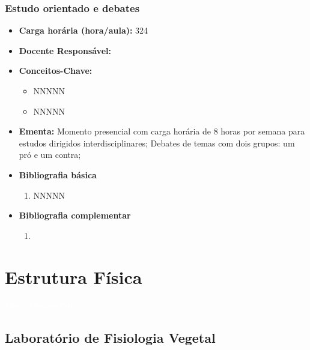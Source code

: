 \documentclass[11pt,fleqn]{book} %
\begin{document}
\newpage
\subsection{Estudo orientado e debates}\label{disc:estudo}
\begin{itemize}
	\item \textbf{Carga horária (hora/aula):} 324
	\item \textbf{Docente Responsável:}
	\item \textbf{Conceitos-Chave:}
	\begin{itemize}
		\item NNNNN
		\item NNNNN
	\end{itemize}
	\item \textbf{Ementa:} Momento presencial com carga horária de 8 horas por semana para estudos dirigidos interdisciplinares; Debates de temas com dois grupos: um pró e um contra;
	\item \textbf{Bibliografia básica}
	\begin{enumerate}
		\item NNNNN
	\end{enumerate}
	\item \textbf{Bibliografia complementar}
	\begin{enumerate}
		\item 
	\end{enumerate}	
\end{itemize}



\chapter{Estrutura Física}
\vspace{6em}
\begin{flushright}
	\textit{\textcolor{white}{Foto: Adriano Darosci}}
\end{flushright}
\vspace{12em}

\section{Laboratório de Fisiologia Vegetal}
\end{document}
